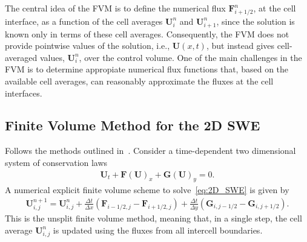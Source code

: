 The central idea of the FVM is to define the numerical flux $\mathbf{F}_{i+1/2}^n$, at the cell interface, as a function of the cell averages $\mathbf{U}_i^n$ and $\mathbf{U}_{i+1}^n$, since the solution is known only in terms of these cell averages.
Consequently, the FVM does not provide pointwise values of the solution, i.e., $\mathbf{U}(x,t)$, but instead gives cell-averaged values, $\mathbf{U}_i^n$, over the control volume.
One of the main challenges in the FVM is to determine appropiate numerical flux functions that, based on the available cell averages, can reasonably approximate the fluxes at the cell interfaces. 



\subsection{Finite Volume Method for the 2D SWE}
Follows the methods outlined in~\cite{Toro2009-Riemann}.
Consider a time-dependent two dimensional system of conservation laws
\begin{align}\label{eq:2D_SWE}
    \mathbf{U}_t + \mathbf{F(U)}_x + \mathbf{G(U)}_y = 0.
\end{align}
A numerical explicit finite volume scheme to solve~\eqref{eq:2D_SWE} is given by
\begin{align}
    \mathbf{U}_{i,j}^{n+1} = \mathbf{U}_{i,j}^n + \frac{\Delta t}{\Delta x}(\mathbf{F}_{i-1/2,j} - \mathbf{F}_{i+1/2,j}) + \frac{\Delta t}{\Delta y}(\mathbf{G}_{i,j-1/2} - \mathbf{G}_{i,j+1/2}).
\end{align}
This is the unsplit finite volume method, meaning that, in a single step, the cell average $\mathbf{U}_{i,j}^n$ is updated using the fluxes from all intercell boundaries.


